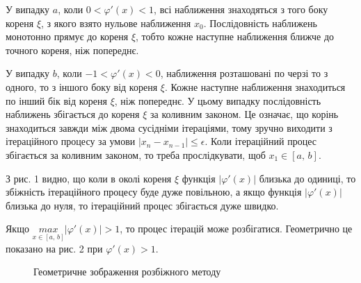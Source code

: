 \documentclass[14pt,a4paper,titlepage]{extarticle}
\begin{document}
У випадку $a$, коли $0<\varphi'(x)<1$, всі наближення знаходяться з того боку кореня $\xi$, з якого взято нульове наближення $x_0$. Послідовність наближень монотонно прямує до кореня $\xi$, тобто кожне наступне наближення ближче до точного кореня, ніж попереднє.

У випадку $b$, коли $-1<\varphi'(x)<0$, наближення розташовані по черзі то з одного, то з іншого боку від кореня $\xi$. Кожне наступне наближення знаходиться по інший бік від кореня $\xi$, ніж попереднє. У цьому випадку послідовність наближень збігається до кореня $\xi$ за коливним законом. Це означає, що корінь знаходиться завжди між двома сусідніми ітераціями, тому зручно виходити з ітераційного процесу за умови $\left|x_n-x_{n-1}\right|\leqslant\epsilon$. Коли ітераційний процес збігається за коливним законом, то треба прослідкувати, щоб $x_1\in[a,\, b]$.

З рис. 1 видно, що коли в околі кореня $\xi$ функція $\left|\varphi'(x)\right|$ близька до одиниці, то збіжність ітераційного процесу буде дуже повільною, а якщо функція $\left|\varphi'(x)\right|$ близька до нуля, то ітераційний процес збігається дуже швидко.

Якщо $\underset{x\in [a,\, b]}{max}\left|\varphi'(x)\right|>1$, то процес ітерацій може розбігатися. Геометрично це показано на рис. 2 при $\varphi'(x)>1$.

\begin{figure}[h]
\caption{Геометричне зображення розбіжного методу}
\end{figure}
\end{document}
